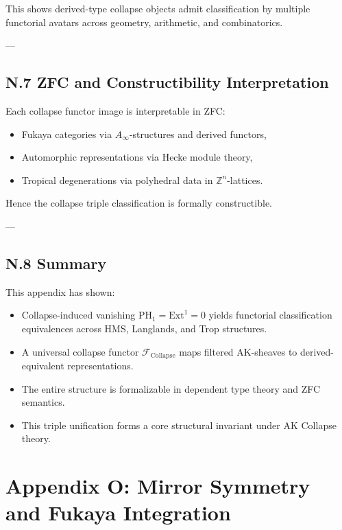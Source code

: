 \documentclass[11pt]{article}
\begin{document}
This shows derived-type collapse objects admit classification by multiple functorial avatars across geometry, arithmetic, and combinatorics.

---

\subsection*{N.7 ZFC and Constructibility Interpretation}

Each collapse functor image is interpretable in ZFC:

\begin{itemize}
  \item Fukaya categories via $A_\infty$-structures and derived functors,
  \item Automorphic representations via Hecke module theory,
  \item Tropical degenerations via polyhedral data in $\mathbb{Z}^n$-lattices.
\end{itemize}

Hence the collapse triple classification is formally constructible.

---

\subsection*{N.8 Summary}

This appendix has shown:
\begin{itemize}
  \item Collapse-induced vanishing $\mathrm{PH}_1 = \mathrm{Ext}^1 = 0$ yields functorial classification equivalences across HMS, Langlands, and Trop structures.
  \item A universal collapse functor $\mathcal{F}_{\mathrm{Collapse}}$ maps filtered AK-sheaves to derived-equivalent representations.
  \item The entire structure is formalizable in dependent type theory and ZFC semantics.
  \item This triple unification forms a core structural invariant under AK Collapse theory.
\end{itemize}




\section*{Appendix O: Mirror Symmetry and Fukaya Integration}
\end{document}
